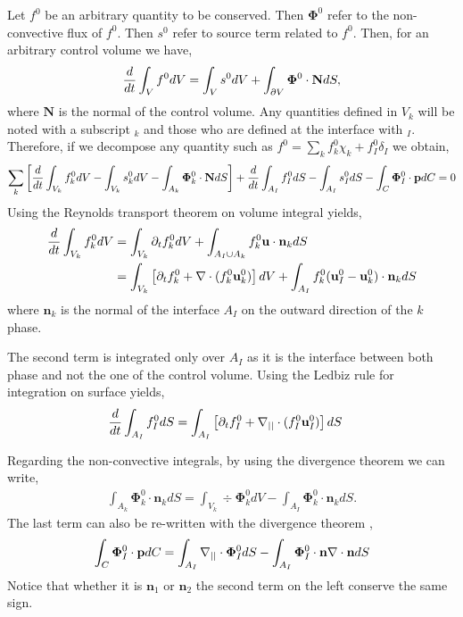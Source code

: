 Let $f^0$  be an arbitrary quantity to be conserved. 
Then $\bm\Phi^0$ refer to the non-convective flux of $f^0$. 
Then $s^0$ refer to source term  related to  $f^0$. 
Then, for an arbitrary control volume we have, 
\begin{equation*}
    \frac{d}{d t} \int_{V} f^0 dV 
    = 
    \int_{V} s^0 dV 
    + \int_{\partial V} \mathbf{\Phi}^0 \cdot \textbf{N} dS,
\end{equation*}
where $\textbf{N}$ is the normal of the control volume. 
Any quantities defined in $V_k$ will be noted with a subscript $_k$ and those who are defined at the interface with $_I$. 
Therefore, if we decompose any quantity such as $f^0 = \sum_k f_k^0 \chi_k + f_I^0 \delta_I$ we obtain, 
\begin{multline*}
    \sum_k\left[\frac{d}{d t} \int_{V_k} f_k^0 dV 
    - \int_{V_k} s_k^0 dV 
    - \int_{A_k} \mathbf{\Phi}_k^0 \cdot \textbf{N} dS
    \right]
    + \frac{d}{d t} \int_{A_I} f_I^0 dS 
    - \int_{A_I} s_I^0 dS 
    - \int_{C} \mathbf{\Phi}_I^0 \cdot \textbf{p} dC 
    = 0
\end{multline*}
Using the Reynolds transport theorem on volume integral yields,
\begin{align*}
    \frac{d}{d t} \int_{V_k} f_k^0 dV 
    &= \int_{V_k} \partial_t f_k^0 dV 
    + \int_{A_I \cup A_k} f_k^0 \textbf{u} \cdot \textbf{n}_k dS\\
    &= \int_{V_k} \left[
        \partial_t f_k^0  + \mathbf{\nabla}\cdot (f_k^0 \textbf{u}_k^0) 
    \right]dV 
    + \int_{A_I} f_k^0 (\textbf{u}_I^0 - \textbf{u}_k^0) \cdot \textbf{n}_k dS\\
\end{align*}
where $\textbf{n}_k$ is the normal of the interface $A_I$ on the outward direction of the $k$ phase. 

The second term is integrated only over $A_I$ as it is the interface between both phase and not the one of the control volume. 
Using the Ledbiz rule for integration on surface yields, 
\begin{align*}
    \frac{d}{d t} \int_{A_I} f_I^0 dS 
    &= \int_{A_I} \left[
        \partial_t f_I^0  + \mathbf{\nabla}_{||}\cdot (f_I^0 \textbf{u}_I^0) 
    \right]dS
\end{align*}

Regarding the non-convective integrals, by using the divergence theorem we can write\citep{nadim1996concise}, 
\begin{align*}
    \int_{A_k} \mathbf{\Phi}_k^0\cdot \textbf{n}_k dS
    = \int_{V_k} \div\mathbf{\Phi}_k^0 dV
    - \int_{A_I} \mathbf{\Phi}_k^0\cdot \textbf{n}_k dS. 
\end{align*}
The last term can also be re-written with the divergence theorem \citet{nadim1996concise},
\begin{align*}
    \int_{C} \mathbf{\Phi}_I^0\cdot \textbf{p} dC 
    = \int_{A_I} \mathbf{\nabla}_{||}\cdot \mathbf{\Phi}_I^0 dS
    - \int_{A_I} \mathbf{\Phi}_I^0 \cdot \textbf{n} \mathbf{\nabla}\cdot \textbf{n} dS
\end{align*}
Notice that whether it is $\textbf{n}_1$ or $\textbf{n}_2$ the second term on the left conserve the same sign. 

